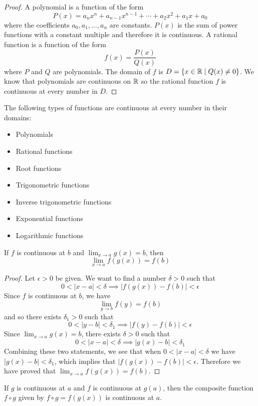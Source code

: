 \begin{proof}
    A polynomial is a function of the form
    \[P(x)=a_nx^n+a_{n-1}x^{n-1}+\dotsb +a_{2}x^{2}+a_1x+a_0\]
    where the coefficients \(a_0,a_1,\dots,a_n\) are constants.
    \(P(x)\) is the sum of power functions with a constant multiple and
    therefore it is continuous.
    A rational function is a function of the form
    \[f(x)=\frac{P(x)}{Q(x)}\]
    where \(P\) and \(Q\) are polynomials.
    The domain of \(f\) is \(D=\{x\in\mathbb{R}\mid Q(x)\neq 0\}\).
    We know that polynomials are continuous on \(\mathbb{R}\) so the rational function
    \(f\) is continuous at every number in \(D\).
\end{proof}
\begin{theorem}
    The following types of functions are continuous at every number in their
    domains:
    \begin{itemize}
        \item Polynomials
        \item Rational functions
        \item Root functions
        \item Trigonometric functions
        \item Inverse trigonometric functions
        \item Exponential functions
        \item Logarithmic functions
    \end{itemize}
\end{theorem}
\begin{theorem}
    If \(f\) is continuous at \(b\) and
    \(\displaystyle{\lim_{x\to a}g(x)=b}\),
    then
    \[\lim_{x\to a}f(g(x))=f(b)\]
\end{theorem}
\begin{proof}
    Let \(\epsilon>0\) be given.
    We want to find a number \(\delta>0\) such that
    \[0<|x-a|<\delta\implies|f(g(x))-f(b)|<\epsilon\]
    Since \(f\) is continuous at \(b\),
    we have
    \[\lim_{y\to b}f(y)=f(b)\]
    and so there exists \(\delta_1>0\) such that
    \[0<|y-b|<\delta_1\implies|f(y)-f(b)|<\epsilon\]
    Since \(\displaystyle{\lim_{x\to a}g(x)=b}\),
    there exists \(\delta>0\) such that
    \[0<|x-a|<\delta\implies|g(x)-b|<\delta_1\]
    Combining these two statements,
    we see that when \(0<|x-a|<\delta\) we have \(|g(x)-b|<\delta_1\),
    which implies that \(|f(g(x))-f(b)|<\epsilon\).
    Therefore we have proved that \(\displaystyle{\lim_{x\to a}f(g(x))=f(b)}\).
\end{proof}
\begin{theorem}
    If \(g\) is continuous at \(a\) and \(f\) is continuous at \(g(a)\),
    then the composite function \(f\circ g\) given by \(f\circ g=f(g(x))\) is
    continuous at \(a\).
\end{theorem}
